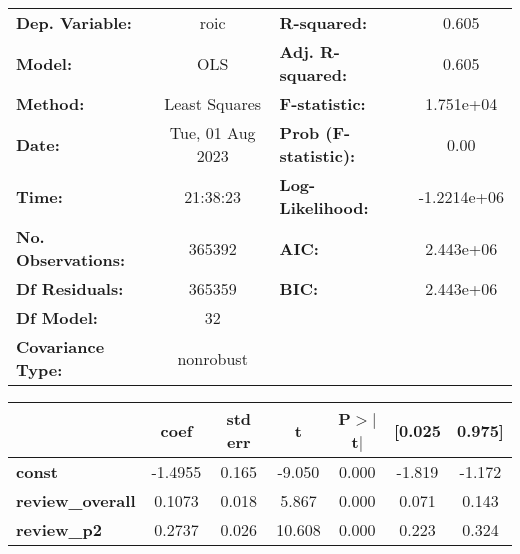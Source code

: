 \begin{center}
\begin{tabular}{lclc}
\toprule
\textbf{Dep. Variable:}                                               &       roic       & \textbf{  R-squared:         } &      0.605   \\
\textbf{Model:}                                                       &       OLS        & \textbf{  Adj. R-squared:    } &      0.605   \\
\textbf{Method:}                                                      &  Least Squares   & \textbf{  F-statistic:       } &  1.751e+04   \\
\textbf{Date:}                                                        & Tue, 01 Aug 2023 & \textbf{  Prob (F-statistic):} &      0.00    \\
\textbf{Time:}                                                        &     21:38:23     & \textbf{  Log-Likelihood:    } & -1.2214e+06  \\
\textbf{No. Observations:}                                            &      365392      & \textbf{  AIC:               } &  2.443e+06   \\
\textbf{Df Residuals:}                                                &      365359      & \textbf{  BIC:               } &  2.443e+06   \\
\textbf{Df Model:}                                                    &          32      & \textbf{                     } &              \\
\textbf{Covariance Type:}                                             &    nonrobust     & \textbf{                     } &              \\
\bottomrule
\end{tabular}
\begin{tabular}{lcccccc}
                                                                      & \textbf{coef} & \textbf{std err} & \textbf{t} & \textbf{P$> |$t$|$} & \textbf{[0.025} & \textbf{0.975]}  \\
\midrule
\textbf{const}                                                        &      -1.4955  &        0.165     &    -9.050  &         0.000        &       -1.819    &       -1.172     \\
\textbf{review\_overall}                                              &       0.1073  &        0.018     &     5.867  &         0.000        &        0.071    &        0.143     \\
\textbf{review\_p2}                                                   &       0.2737  &        0.026     &    10.608  &         0.000        &        0.223    &        0.324     \\

\end{tabular}
\end{center}
